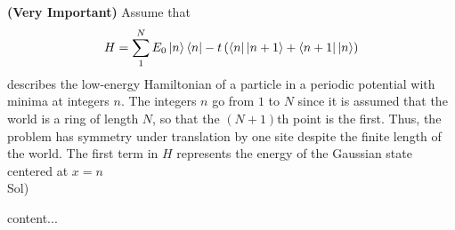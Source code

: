 \documentclass[paper=a4, fontsize=11pt]{scrartcl}
\numberwithin{equation}{section}
\numberwithin{figure}{section}
\numberwithin{table}{section}
\newenvironment{problem}{\subsection{}}{}
\newenvironment{solution}{Sol) \begin{adjustwidth}{0.2in}{}\vspace{0.1in}}{\end{adjustwidth}}
\begin{document}
\begin{problem}
	\textbf{(Very Important)} Assume that\\
	\begin{equation}
		H=\sum_{1}^{N} E_0 \ket{n} \bra{n} - t\left( \bra{n}\ket{n+1}+\bra{n+1}\ket{n}\right)
	\nonumber
	\end{equation}
	describes the low-energy Hamiltonian of a particle in a periodic potential with minima at integers $n$. The integers $n$ go from $1$ to $N$ since it is assumed that the world is a ring of length $N$, so that the $(N+1)$th point is the ﬁrst. Thus, the problem has symmetry under translation by one site despite the ﬁnite length of the world. The ﬁrst term in $H$ represents the energy of the Gaussian state centered at $x=n$ 
\end{problem}\\

\begin{solution}
	content...
\end{solution}

\vskip 0.3in
\end{document}
